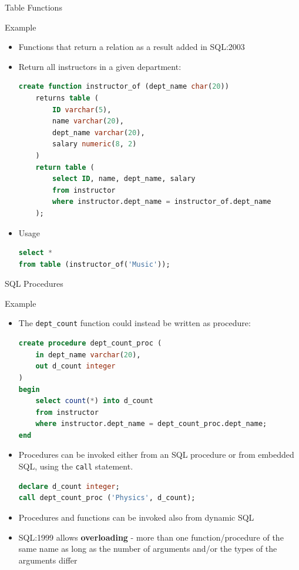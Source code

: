 \documentclass[aspectratio=169, xcolor=dvipsnames]{beamer}
\begin{document}
\begin{frame}[fragile]{Table Functions}
    \begin{exampleblock}{Example}
        \begin{itemize}[<+->]
            \item Functions that return a relation as a result added in SQL:2003
            \item Return all instructors in a given department:
            \begin{lstlisting}[language=SQL, basicstyle=\ttfamily\tiny]
create function instructor_of (dept_name char(20))
    returns table (
        ID varchar(5), 
        name varchar(20),
        dept_name varchar(20),
        salary numeric(8, 2)
    )
    return table ( 
        select ID, name, dept_name, salary 
        from instructor 
        where instructor.dept_name = instructor_of.dept_name 
    );
            \end{lstlisting}
            \item Usage
            \begin{lstlisting}[language=SQL, basicstyle=\ttfamily\tiny]
select *
from table (instructor_of('Music'));
            \end{lstlisting}
        \end{itemize}
    \end{exampleblock}
\end{frame}

\begin{frame}[fragile]{SQL Procedures}
    \begin{exampleblock}{Example}
        \begin{itemize}[<+->]
            \item The \texttt{dept\_count} function could instead be written as procedure:
            \begin{lstlisting}[language=SQL, basicstyle=\ttfamily\scriptsize]
create procedure dept_count_proc (
    in dept_name varchar(20), 
    out d_count integer
)
begin
    select count(*) into d_count
    from instructor
    where instructor.dept_name = dept_count_proc.dept_name;
end
            \end{lstlisting}
            \item Procedures can be invoked either from an SQL procedure or from embedded SQL, using the \texttt{call} statement.
            \begin{lstlisting}[language=SQL, basicstyle=\ttfamily\scriptsize]
declare d_count integer; 
call dept_count_proc ('Physics', d_count);
            \end{lstlisting}
            \item Procedures and functions can be invoked also from dynamic SQL
            \item SQL:1999 allows \textbf{overloading} - more than one function/procedure of the same name as long as the number of arguments and/or the types of the arguments differ
        \end{itemize}
    \end{exampleblock}
\end{frame}
\end{document}
